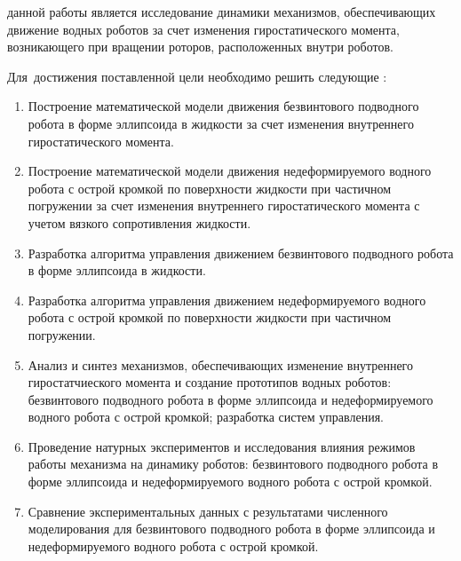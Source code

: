 
{\aim} данной работы является исследование динамики механизмов, обеспечивающих движение водных роботов за счет изменения гиростатического момента, возникающего при вращении роторов, расположенных внутри роботов.

Для~достижения поставленной цели необходимо решить следующие {\tasks}:
\begin{enumerate}
  \item Построение математической модели движения безвинтового подводного робота в форме эллипсоида в жидкости за счет изменения внутреннего гиростатического момента.
  \item Построение математической модели движения недеформируемого водного робота с острой кромкой по поверхности жидкости при частичном погружении за счет изменения внутреннего гиростатического момента с учетом вязкого сопротивления жидкости.
  \item Разработка алгоритма управления движением безвинтового подводного робота в форме эллипсоида в жидкости.
  \item Разработка алгоритма управления движением недеформируемого водного робота с острой кромкой по поверхности жидкости при частичном погружении.
  \item Анализ и синтез механизмов, обеспечивающих изменение внутреннего гиростатчиеского момента и создание прототипов водных роботов: безвинтового подводного робота в форме эллипсоида и недеформируемого водного робота с острой кромкой; разработка систем управления.
  \item Проведение натурных экспериментов и исследования влияния режимов работы механизма на динамику роботов: безвинтового подводного робота в форме эллипсоида и недеформируемого водного робота с острой кромкой.
  \item Сравнение экспериментальных данных с результатами численного моделирования для безвинтового подводного робота в форме эллипсоида и недеформируемого водного робота с острой кромкой.
\end{enumerate}



